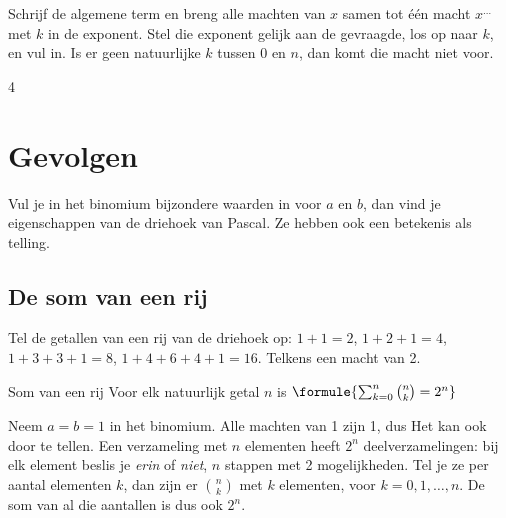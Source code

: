 \begin{werkwijze}
Schrijf de algemene term en breng alle machten van $x$ samen tot één macht $x^{\ldots}$ met $k$ in de exponent. Stel die exponent gelijk aan de gevraagde, los op naar $k$, en vul in. Is er geen natuurlijke $k$ tussen 0 en $n$, dan komt die macht niet voor.
\end{werkwijze}

\begin{alleenvoor}{4}
\begin{oefeningen}

\end{oefeningen}
\end{alleenvoor}

\section{Gevolgen}

Vul je in het binomium bijzondere waarden in voor $a$ en $b$, dan vind je eigenschappen van de driehoek van Pascal. Ze hebben ook een betekenis als telling.

\subsection{De som van een rij}

Tel de getallen van een rij van de driehoek op: $1 + 1 = 2$, $1 + 2 + 1 = 4$, $1 + 3 + 3 + 1 = 8$, $1 + 4 + 6 + 4 + 1 = 16$. Telkens een macht van 2.

\begin{theorie}
\begin{stelling}{Som van een rij}
Voor elk natuurlijk getal $n$ is \quad $\formule{\sum_{k=0}^{n} \binom{n}{k} = 2^n}$
\end{stelling}

\begin{bewijs}
Neem $a = b = 1$ in het binomium. Alle machten van 1 zijn 1, dus
Het kan ook door te tellen. Een verzameling met $n$ elementen heeft $2^n$ deelverzamelingen: bij elk element beslis je \textit{erin} of \textit{niet}, $n$ stappen met 2 mogelijkheden. Tel je ze per aantal elementen $k$, dan zijn er $\binom{n}{k}$ met $k$ elementen, voor $k = 0, 1, \ldots, n$. De som van al die aantallen is dus ook $2^n$.
\end{bewijs}
\end{theorie}

